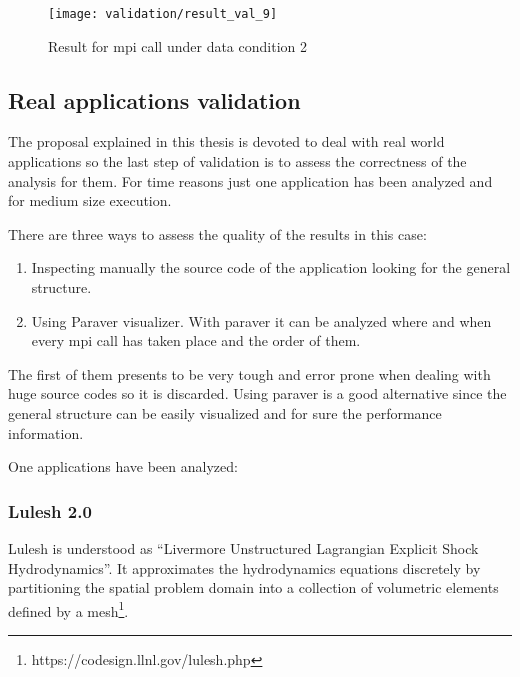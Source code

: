 \begin{figure}[H]
    \centering
    \texttt{[image: validation/result\_val\_9]}
    \caption{Result for mpi call under data condition 2}
    \label{fig:result_val_9}
\end{figure}

\subsection{Real applications validation}

The proposal explained in this thesis is devoted to deal with real world
applications so the last step of validation is to assess the correctness of the
analysis for them. For time reasons just one application has been analyzed and
for medium size execution.

There are three ways to assess the quality of the results in this case:
\begin{enumerate}[label=\roman*)]
  \item Inspecting manually the source code of the application looking for the
    general structure. 
  \item Using Paraver visualizer. With paraver it can be analyzed where and when
    every mpi call has taken place and the order of them. 
\end{enumerate}

The first of them presents to be very tough and error prone when dealing with
huge source codes so it is discarded. Using paraver is a good alternative since
the general structure can be easily visualized and for sure the performance
information. 

One applications have been analyzed:

\subsubsection{Lulesh 2.0}

Lulesh is understood as ``Livermore Unstructured Lagrangian Explicit
Shock Hydrodynamics''. It approximates the hydrodynamics equations discretely 
by partitioning the spatial problem domain into a collection of volumetric 
elements defined by a mesh\footnote{https://codesign.llnl.gov/lulesh.php}.

